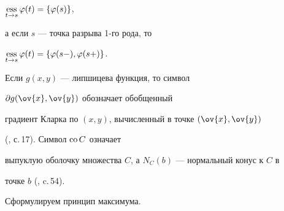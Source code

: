 $\ess\limits_{t \rightarrow s}\varphi(t)=\{\varphi(s)\}$,


а если $s$ --- точка разрыва 1-го рода, то


$\ess\limits_{t \rightarrow s}\varphi(t)= \{\varphi(s-),


\varphi(s+)\}$.





Если $g(x,y)$ --- липшицева функция, то символ


$\partial g(\ov{x},\ov{y})$ обозначает обобщенный


градиент Кларка по $(x,y)$, вычисленный в точке $(\ov{x},\ov{y})$


(\cite{23}, с.\,17). Символ $\operatorname{co} C$ означает


выпуклую оболочку множества $C$, а $N_C(b)$ --- нормальный конус к $C$ в


точке $b$ (\cite{23}, c.\,54).





Сформулируем принцип максимума.





